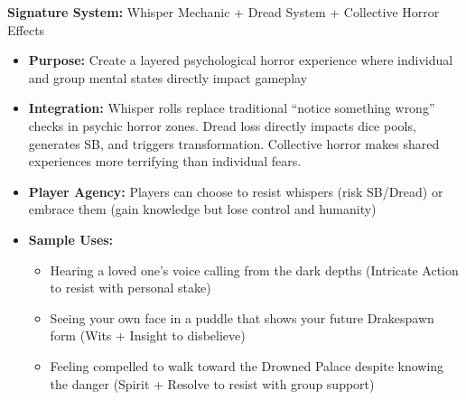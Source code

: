 \documentclass[11pt]{article}
\begin{document}
\textbf{Signature System:} Whisper Mechanic + Dread System + Collective Horror Effects
\begin{itemize}
\item \textbf{Purpose:} Create a layered psychological horror experience where individual and group mental states directly impact gameplay
\item \textbf{Integration:} Whisper rolls replace traditional ``notice something wrong'' checks in psychic horror zones. Dread loss directly impacts dice pools, generates SB, and triggers transformation. Collective horror makes shared experiences more terrifying than individual fears.
\item \textbf{Player Agency:} Players can choose to resist whispers (risk SB/Dread) or embrace them (gain knowledge but lose control and humanity)
\item \textbf{Sample Uses:}
  \begin{itemize}
  \item Hearing a loved one's voice calling from the dark depths (Intricate Action to resist with personal stake)
  \item Seeing your own face in a puddle that shows your future Drakespawn form (Wits + Insight to disbelieve)
  \item Feeling compelled to walk toward the Drowned Palace despite knowing the danger (Spirit + Resolve to resist with group support)
  \end{itemize}
\end{itemize}
\end{document}
